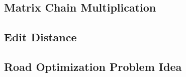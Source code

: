 \subsection*{Matrix Chain Multiplication}
\lipsum[1][1-2]
\subsection*{Edit Distance}
\lipsum[1][1-2]
\subsection*{Road Optimization Problem Idea}
\lipsum[1][1-2]

